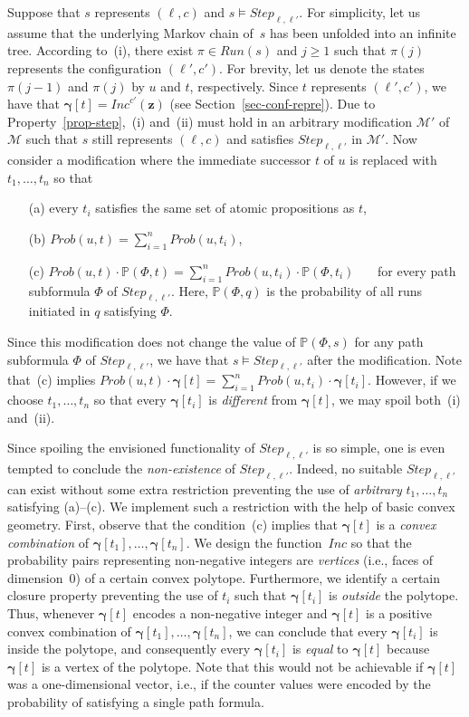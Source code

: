 \documentclass[a4paper,UKenglish,cleveref, autoref, thm-restate]{lipics-v2021}
\newcommand{\M}{\mathcal{M}}
\newcommand{\run}{\textit{Run}}
\newcommand{\Step}{\mathit{Step}}
\newcommand{\INC}{\mathit{Inc}}
\newcommand{\Prob}{\mathit{Prob}}
\renewcommand{\vec}[1]{\pmb{#1}}
\newcommand{\cv}{\vec{\gamma}}
\newcommand*{\m}{\mathbb{P}}
\begin{document}
Suppose that $s$ represents $(\ell,c)$ and $s \models \Step_{\ell,\ell'}$. For simplicity, let us assume that the underlying Markov chain of~$s$ has been unfolded into an infinite tree. According to~(i), there exist $\pi \in \run(s)$ and $j\geq 1$ such that $\pi(j)$ represents the configuration $(\ell',c')$. For brevity, let us denote the states $\pi(j{-}1)$ and $\pi(j)$ by $u$ and $t$, respectively.  Since $t$ represents $(\ell',c')$, we have that $\cv[t] = \INC^{c'}(\vec{z})$ (see Section~\ref{sec-conf-repre}). Due to Property~\ref{prop-step},~(i) and~(ii) must hold in an arbitrary modification $\M'$ of $\M$ such that $s$ still represents $(\ell,c)$ and satisfies $\Step_{\ell,\ell'}$ in $\M'$.  Now consider a modification where the immediate successor $t$ of $u$ is replaced with $t_1,\ldots,t_n$ so that
\begin{enumerate}
    \item[(a)] every $t_i$ satisfies the same set of atomic propositions as $t$,
    \item[(b)] $\Prob(u,t) = \sum_{i=1}^n \Prob(u,t_i)$,
\item[(c)] $\Prob(u,t) \cdot \m(\Phi,t) = \sum_{i=1}^{n} \Prob(u,t_i) \cdot \m(\Phi,t_i)$~~~ for every path subformula $\Phi$ of $\Step_{\ell,\ell'}$. Here, $\m(\Phi,q)$ is the probability of all runs initiated in $q$ satisfying $\Phi$.
\end{enumerate}
Since this modification does not change the value of $\m(\Phi,s)$ for any path subformula $\Phi$ of $\Step_{\ell,\ell'}$, we have that  $s \models \Step_{\ell,\ell'}$ after the modification. Note that~(c) implies $\Prob(u,t) \cdot \cv[t] = \sum_{i=1}^{n} \Prob(u,t_i) \cdot \cv[t_i]$. However, if we choose $t_1,\ldots,t_n$ so that every $\cv[t_i]$ is \emph{different} from $\cv[t]$, we may spoil both~(i) and~(ii).

Since spoiling the envisioned functionality of $\Step_{\ell,\ell'}$ is so simple, one is even tempted to conclude the \emph{non-existence} of $\Step_{\ell,\ell'}$. Indeed, no suitable $\Step_{\ell,\ell'}$ can exist without some extra restriction preventing the use of \emph{arbitrary} $t_1,\ldots,t_n$ satisfying (a)--(c). We implement such a restriction with the help of basic convex geometry. First, observe that the condition~(c) implies that $\cv[t]$ is a \emph{convex combination} of $\cv[t_1],\ldots,\cv[t_n]$. We design the function~$\INC$
so that the probability pairs representing non-negative integers are \emph{vertices} (i.e., faces of dimension~$0$) of a certain convex polytope. Furthermore, we identify a certain closure property preventing the use of $t_i$ such that $\cv[t_i]$ is \emph{outside} the polytope. Thus, whenever $\cv[t]$ encodes a non-negative integer and $\cv[t]$ is a positive convex combination of $\cv[t_1],\ldots,\cv[t_n]$, we can conclude that every $\cv[t_i]$ is inside the polytope, and consequently every $\cv[t_i]$ is \emph{equal} to $\cv[t]$ because $\cv[t]$ is a vertex of the polytope. Note that this would not be achievable if $\cv[t]$ was a one-dimensional vector, i.e., if the counter values were encoded by the probability of satisfying a single path formula.
\end{document}
